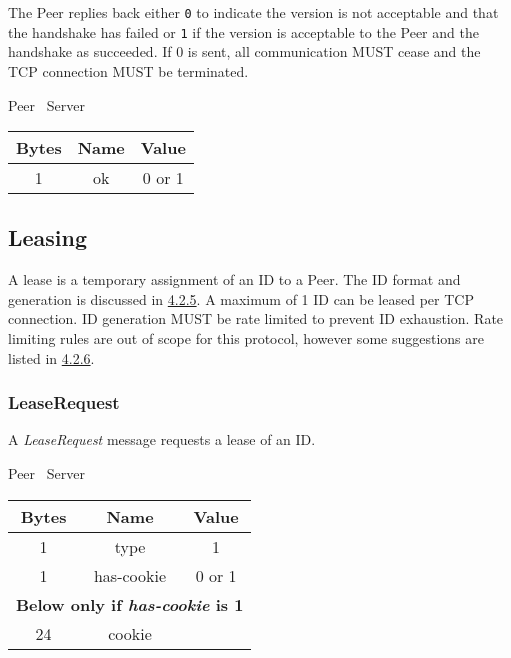 \documentclass{article}
\begin{document}
    The Peer replies back either \texttt{0} to indicate the version is not acceptable and that the handshake has
    failed or \texttt{1} if the version is acceptable to the Peer and the handshake as succeeded. If 0 is sent, all
    communication MUST cease and the TCP connection MUST be terminated.

    \begin{center}
        Peer \textrightarrow\ Server\\
        \begin{tabular}{|c|c|c|}
            \hline
            \textbf{Bytes} & \textbf{Name} & \textbf{Value} \\
            \hline
            1              & ok            & 0 or 1         \\
            \hline
        \end{tabular}
    \end{center}

    \subsection{Leasing}

    A lease is a temporary assignment of an ID to a Peer. The ID format and generation is discussed in
    \hyperlink{subsubsection.4.2.5}{4.2.5}. A maximum of 1 ID can be leased per TCP connection. ID generation MUST be
    rate limited to prevent ID exhaustion. Rate limiting rules are out of scope for this protocol, however some
    suggestions are listed in \hyperlink{subsubsection.4.2.6}{4.2.6}.

    \subsubsection{LeaseRequest}

    A \emph{LeaseRequest} message requests a lease of an ID.

    \begin{center}
        Peer \textrightarrow\ Server\\
        \begin{tabular}{|c|c|c|}
            \hline
            \textbf{Bytes} & \textbf{Name} & \textbf{Value} \\
            \hline
            1              & type          & 1              \\
            \hline
            1              & has-cookie    & 0 or 1         \\
            \hline
            \multicolumn{3}{|c|}{\textbf{Below only if \emph{has-cookie} is 1} } \\
            \hline
            24             & cookie        &                \\
            \hline
        \end{tabular}
    \end{center}
\end{document}
